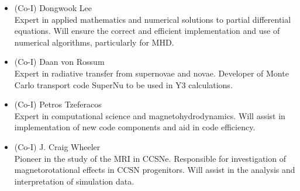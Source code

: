 \documentclass[12pt,letterpaper,english]{article}
\begin{document}
\begin{itemize}
\item (Co-I) Dongwook Lee \\
Expert in applied mathematics and numerical solutions to partial
differential equations.  Will ensure the correct and efficient implementation and use of
numerical algorithms, particularly for MHD.\\
\item (Co-I) Daan von Rossum \\
Expert in radiative transfer from supernovae and novae.  Developer of Monte Carlo transport code SuperNu to be used in Y3 calculations. \\
\item (Co-I) Petros Tzeferacos \\
Expert in computational science and magnetohydrodynamics.  Will assist
in implementation of new code components and aid in code efficiency.\\
\item (Co-I) J. Craig Wheeler \\
Pioneer in the study of the MRI in CCSNe.  Responsible for investigation of magnetorotational effects in CCSN
progenitors.  Will assist in the analysis and interpretation of
simulation data.\\

\end{itemize} 
\end{document}

